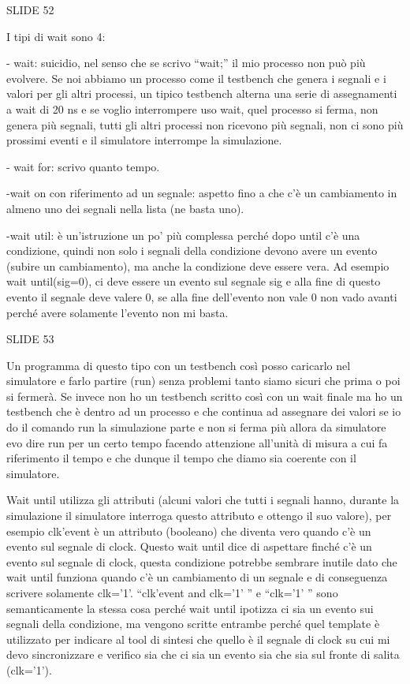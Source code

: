 \documentclass[10pt,a4paper,titlepage]{article}
\begin{document}
SLIDE 52

I tipi di wait sono 4:

- wait: suicidio, nel senso che se scrivo “wait;” il mio processo non può più evolvere. Se noi abbiamo un processo come il testbench che genera i segnali e i valori per gli altri processi, un tipico testbench alterna una serie di assegnamenti a wait di 20 ns e se voglio interrompere uso wait, quel processo si ferma, non genera più segnali, tutti gli altri processi non ricevono più segnali, non ci sono più prossimi eventi e il simulatore interrompe la simulazione.

- wait for: scrivo quanto tempo.

-wait on con riferimento ad un segnale: aspetto fino a che c’è un cambiamento in almeno uno dei segnali nella lista (ne basta uno).

-wait util: è un’istruzione un po’ più complessa perché dopo until c’è una condizione, quindi non solo i segnali della condizione devono avere un evento (subire un cambiamento), ma anche la condizione deve essere vera. Ad esempio wait until(sig=0), ci deve essere un evento sul segnale sig e alla fine di questo evento il segnale deve valere 0, se alla fine dell’evento non vale 0 non vado avanti perché avere solamente l’evento non mi basta.

SLIDE 53

Un programma di questo tipo con un testbench così posso caricarlo nel simulatore e farlo partire (run) senza problemi tanto siamo sicuri che prima o poi si fermerà. Se invece non ho un testbench scritto così con un wait finale ma ho un testbench che è dentro ad un processo e che continua ad assegnare dei valori se io do il comando run la simulazione parte e non si ferma più allora da simulatore evo dire run per un certo tempo facendo attenzione all’unità di misura a cui fa riferimento il tempo e che dunque il tempo che diamo sia coerente con il simulatore.

Wait until utilizza gli attributi (alcuni valori che tutti i segnali hanno, durante la simulazione il simulatore interroga questo attributo e ottengo il suo valore), per esempio clk’event è un attributo (booleano) che diventa vero quando c’è un evento sul segnale di clock. Questo wait until dice di aspettare finché c’è un evento sul segnale di clock, questa condizione potrebbe sembrare inutile dato che wait until funziona quando c’è un cambiamento di un segnale e di conseguenza scrivere solamente clk=’1’.  “clk’event and clk=’1’ ” e “clk=’1’ ” sono semanticamente la stessa cosa perché wait until ipotizza ci sia un evento sui segnali della condizione, ma vengono scritte entrambe perché quel template è utilizzato per indicare al tool di sintesi che quello è il segnale di clock su cui mi devo sincronizzare e verifico sia che ci sia un evento sia che sia sul fronte di salita (clk=’1’).
\end{document}
